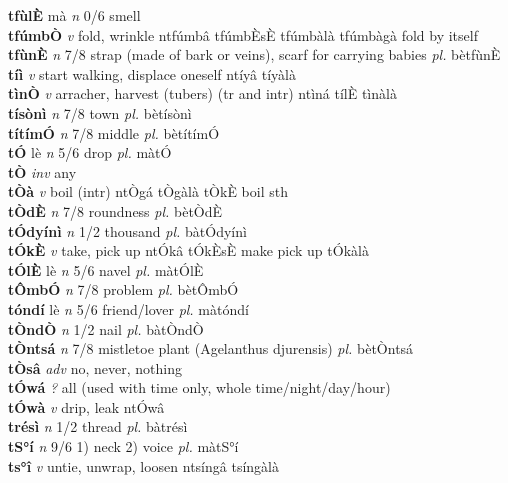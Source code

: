 \documentclass{article}
\begin{document}
{\bf tfùlÈ} mà {\it n} 0/6 smell         \\ 
{\bf tfúmbÒ}  {\it v} fold, wrinkle   ntfúmbâ  tfúmbÈsÈ tfúmbàlà tfúmbàgà fold by itself  \\ 
{\bf tfùnÈ}   {\it n} 7/8 strap (made of bark or veins), scarf for carrying babies {\it pl.} bètfùnÈ         \\ 
{\bf tíì}  {\it v} start walking, displace oneself   ntíyâ   tíyàlà   \\ 
{\bf tìnÒ}  {\it v} arracher, harvest (tubers) (tr and intr)   ntìná tílÈ  tìnàlà   \\ 
{\bf tísònì}  {\it n} 7/8 town {\it pl.} bètísònì         \\ 
{\bf títímÓ}  {\it n} 7/8 middle {\it pl.} bètítímÓ         \\ 
{\bf tÓ} lè {\it n} 5/6 drop {\it pl.} màtÓ         \\ 
{\bf tÒ}  {\it inv} any         \\ 
{\bf tÒà }  {\it v} boil (intr)   ntÒgá   tÒgàlà  tÒkÈ boil sth \\ 
{\bf tÒdÈ}  {\it n} 7/8 roundness {\it pl.} bètÒdÈ         \\ 
{\bf tÓdyínì}  {\it n} 1/2 thousand {\it pl.} bàtÓdyínì         \\ 
{\bf tÓkÈ}  {\it v} take, pick up   ntÓkâ  tÓkÈsÈ make pick up tÓkàlà   \\ 
{\bf tÓlÈ} lè {\it n} 5/6 navel {\it pl.} màtÓlÈ         \\ 
{\bf tÔmbÓ}  {\it n} 7/8 problem {\it pl.} bètÔmbÓ         \\ 
{\bf tóndí} lè {\it n} 5/6 friend/lover {\it pl.} màtóndí         \\ 
{\bf tÒndÒ}  {\it n} 1/2 nail {\it pl.} bàtÒndÒ         \\ 
{\bf tÒntsá}  {\it n} 7/8 mistletoe plant (Agelanthus djurensis) {\it pl.} bètÒntsá         \\ 
{\bf tÒsâ}  {\it adv} no, never, nothing         \\ 
{\bf tÓwá}  {\it ?} all (used with time only, whole time/night/day/hour)         \\ 
{\bf tÓwà}  {\it v} drip, leak   ntÓwâ      \\ 
{\bf trésì}  {\it n} 1/2 thread {\it pl.} bàtrésì         \\ 
{\bf tS°í}  {\it n} 9/6 1) neck 2) voice {\it pl.} màtS°í         \\ 
{\bf ts°î}  {\it v} untie, unwrap, loosen   ntsíngâ   tsíngàlà   \\ 
\end{document}
